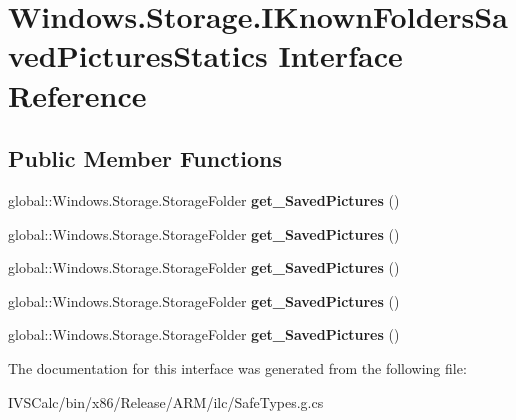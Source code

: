\hypertarget{interface_windows_1_1_storage_1_1_i_known_folders_saved_pictures_statics}{}\section{Windows.\+Storage.\+I\+Known\+Folders\+Saved\+Pictures\+Statics Interface Reference}
\label{interface_windows_1_1_storage_1_1_i_known_folders_saved_pictures_statics}
\subsection*{Public Member Functions}
\begin{DoxyCompactItemize}
\item 
\mbox{\label{interface_windows_1_1_storage_1_1_i_known_folders_saved_pictures_statics_a40fce7c404f996d83e130e770d089638}} 
global\+::\+Windows.\+Storage.\+Storage\+Folder {\bfseries get\+\_\+\+Saved\+Pictures} ()
\item 
\mbox{\label{interface_windows_1_1_storage_1_1_i_known_folders_saved_pictures_statics_a40fce7c404f996d83e130e770d089638}} 
global\+::\+Windows.\+Storage.\+Storage\+Folder {\bfseries get\+\_\+\+Saved\+Pictures} ()
\item 
\mbox{\label{interface_windows_1_1_storage_1_1_i_known_folders_saved_pictures_statics_a40fce7c404f996d83e130e770d089638}} 
global\+::\+Windows.\+Storage.\+Storage\+Folder {\bfseries get\+\_\+\+Saved\+Pictures} ()
\item 
\mbox{\label{interface_windows_1_1_storage_1_1_i_known_folders_saved_pictures_statics_a40fce7c404f996d83e130e770d089638}} 
global\+::\+Windows.\+Storage.\+Storage\+Folder {\bfseries get\+\_\+\+Saved\+Pictures} ()
\item 
\mbox{\label{interface_windows_1_1_storage_1_1_i_known_folders_saved_pictures_statics_a40fce7c404f996d83e130e770d089638}} 
global\+::\+Windows.\+Storage.\+Storage\+Folder {\bfseries get\+\_\+\+Saved\+Pictures} ()
\end{DoxyCompactItemize}


The documentation for this interface was generated from the following file\+:\begin{DoxyCompactItemize}
\item 
I\+V\+S\+Calc/bin/x86/\+Release/\+A\+R\+M/ilc/Safe\+Types.\+g.\+cs\end{DoxyCompactItemize}
